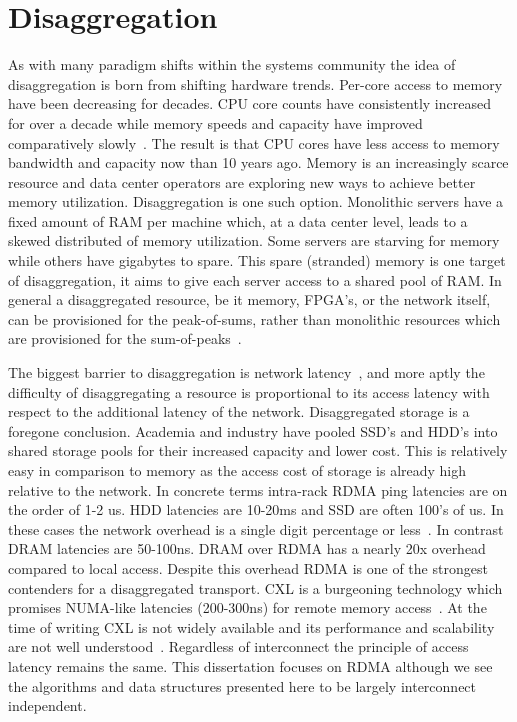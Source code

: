 \documentclass[12pt]{ucsddissertation}
\begin{document}
\section{Disaggregation}

As with many paradigm shifts within the systems community the idea of disaggregation is born from
shifting hardware trends. Per-core access to memory have been decreasing for decades. CPU core
counts have consistently increased for over a decade while memory speeds and capacity have improved
comparatively slowly~\cite{micron-memorywall}. The result is that CPU cores have less access to
memory bandwidth and capacity now than 10 years ago. Memory is an increasingly scarce resource and
data center operators are exploring new ways to achieve better memory utilization.  Disaggregation
is one such option. Monolithic servers have a fixed amount of RAM per machine which, at a data
center level, leads to a skewed distributed of memory utilization.  Some servers are starving for
memory while others have gigabytes to spare. This spare (stranded) memory is one target of
disaggregation, it aims to give each server access to a shared pool of RAM.  In general a
disaggregated resource, be it memory, FPGA's, or the network itself, can be provisioned for the
peak-of-sums, rather than monolithic resources which are provisioned for the
sum-of-peaks~\cite{clio,supernic,dsnf}.

The biggest barrier to disaggregation is network latency~\cite{requirements}, and more aptly the
difficulty of disaggregating a resource is proportional to its access latency with respect to the
additional latency of the network. Disaggregated storage is a foregone conclusion. Academia and
industry have pooled SSD's and HDD's into shared storage pools for their increased capacity and
lower cost. This is relatively easy in comparison to memory as the access cost of storage is already
high relative to the network. In concrete terms intra-rack RDMA ping latencies are on the order of
1-2 us. HDD latencies are 10-20ms and SSD are often 100's of us. In these cases the network overhead
is a single digit percentage or less~\cite{decible}. In contrast DRAM latencies are 50-100ns. DRAM
over RDMA has a nearly 20x overhead compared to local access. Despite this overhead RDMA is one of
the strongest contenders for a disaggregated transport.  CXL is a burgeoning technology which
promises NUMA-like latencies (200-300ns) for remote memory access~\cite{cxl}. At the time of writing
CXL is not widely available and its performance and scalability are not well
understood~\cite{direct-cxl,pond,cxl-demyst}. Regardless of interconnect
the principle of access latency remains the same. This dissertation focuses on RDMA although we see
the algorithms and data structures presented here to be largely interconnect independent.
\end{document}

